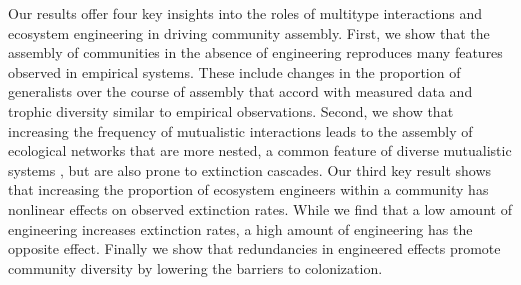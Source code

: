 \documentclass[twocolumn,preprintnumbers,amsmath,amssymb,superscriptaddress,linenumbers]{revtex4-1}
\begin{document}
Our results offer four key insights into the roles of multitype interactions and ecosystem engineering in driving community assembly.
First, we show that the assembly of communities in the absence of engineering reproduces many features observed in empirical systems.
These include changes in the proportion of generalists over the course of assembly that accord with measured data and trophic diversity similar to empirical observations. %
Second, we show that increasing the frequency of mutualistic interactions leads to the assembly of ecological networks that are more nested, a common feature of diverse mutualistic systems \cite{Bascompte2003}, but are also prone to extinction cascades.
Our third key result shows that increasing the proportion of ecosystem engineers within a community has nonlinear effects on observed extinction rates.
While we find that a low amount of engineering increases extinction rates, a high amount of engineering has the opposite effect.
Finally we show that redundancies in engineered effects promote community diversity by lowering the barriers to colonization.\\

\end{document}
